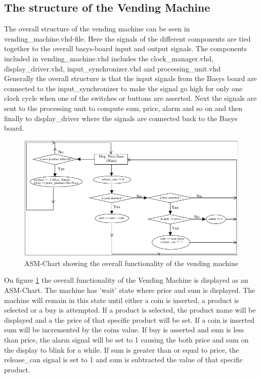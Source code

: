 \subsection{The structure of the Vending Machine}

The overall structure of the vending machine can be seen in vending\_machine.vhd-file. Here the signals of the different components are tied together to the overall basys-board input and output signals. The components included in vending\_machine.vhd includes the clock\_manager.vhd, display\_driver.vhd, input\_synchronizer.vhd and processing\_unit.vhd \\

Generally the overall structure is that the input signals from the Basys board are connected to the input\_synchronizer to make the signal go high for only one clock cycle when one of the switches or buttons are asserted. Next the signals are sent to the processing unit to compute sum, price, alarm and so on and then finally to display\_driver where the signals are connected back to the Basys board.\\

\begin{figure}[h!]
\centering
\includegraphics[scale=0.6]{figs/asm_chart.png}
\caption{ASM-Chart showing the overall functionality of the vending machine}
\label{fig:asm}
\end{figure}

On figure \ref{fig:asm} the overall functionality of the Vending Machine is displayed as an ASM-Chart. The machine has 'wait' state where price and sum is displayed. The machine will remain in this state until either a coin is inserted, a product is selected or a buy is attempted. If a product is selected, the product name will be displayed and a the price of that specific product will be set. If a coin is inserted sum will be incremented by the coins value. If buy is asserted and sum is less than price, the alarm signal will be set to 1 causing the both price and sum on the display to blink for a while. If sum is greater than or equal to price, the release\_can signal is set to 1 and sum is subtracted the value of that specific product.